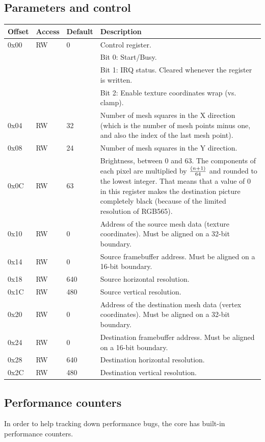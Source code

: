 \documentclass[a4paper,11pt]{article}
\begin{document}
\subsection{Parameters and control}
\begin{tabular}{|l|l|l|p{10.5cm}|}
\hline
\bf{Offset} & \bf{Access} & \bf{Default} & \bf{Description} \\
\hline
0x00 & RW & 0 & Control register. \\
& & & Bit 0: Start/Busy.\\
& & & Bit 1: IRQ status. Cleared whenever the register is written. \\
& & & Bit 2: Enable texture coordinates wrap (vs. clamp). \\
\hline
0x04 & RW & 32 & Number of mesh squares in the X direction (which is the number of mesh points minus one, and also the index of the last mesh point). \\
\hline
0x08 & RW & 24 & Number of mesh squares in the Y direction. \\
\hline
0x0C & RW & 63 & Brightness, between 0 and 63. The components of each pixel are multiplied by $ (n+1) \over 64 $ and rounded to the lowest integer. That means that a value of 0 in this register makes the destination picture completely black (because of the limited resolution of RGB565). \\
\hline
0x10 & RW & 0 & Address of the source mesh data (texture coordinates). Must be aligned on a 32-bit boundary. \\
\hline
0x14 & RW & 0 & Source framebuffer address. Must be aligned on a 16-bit boundary. \\
\hline
0x18 & RW & 640 & Source horizontal resolution. \\
\hline
0x1C & RW & 480 & Source vertical resolution. \\
\hline
0x20 & RW & 0 & Address of the destination mesh data (vertex coordinates). Must be aligned on a 32-bit boundary. \\
\hline
0x24 & RW & 0 & Destination framebuffer address. Must be aligned on a 16-bit boundary. \\
\hline
0x28 & RW & 640 & Destination horizontal resolution. \\
\hline
0x2C & RW & 480 & Destination vertical resolution. \\
\hline
\end{tabular}

\subsection{Performance counters}
In order to help tracking down performance bugs, the core has built-in performance counters.
\end{document}
